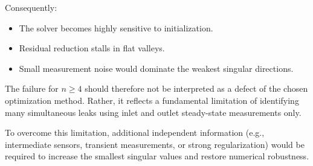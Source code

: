 Consequently:

\begin{itemize}
    \item The solver becomes highly sensitive to initialization.
    \item Residual reduction stalls in flat valleys.
    \item Small measurement noise would dominate the weakest singular directions.
\end{itemize}

The failure for $n \geq 4$ should therefore not be interpreted as a defect of the chosen optimization method. Rather, it reflects a fundamental limitation of identifying many simultaneous leaks using inlet and outlet steady-state measurements only.

To overcome this limitation, additional independent information (e.g., intermediate sensors, transient measurements, or strong regularization) would be required to increase the smallest singular values and restore numerical robustness.